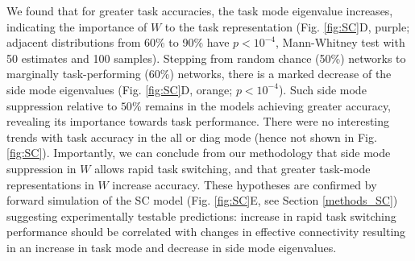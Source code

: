 \documentclass[11pt]{article}
\begin{document}

We found that for greater task accuracies, the task mode eigenvalue increases, indicating the importance of $W$ to the task representation (Fig. \ref{fig:SC}D, purple; adjacent distributions from 60\% to 90\% have  $p<10^{-4}$, Mann-Whitney test with 50 estimates and 100 samples).
Stepping from random chance (50\%) networks to marginally task-performing (60\%) networks, there is a marked decrease of the side mode eigenvalues (Fig. \ref{fig:SC}D, orange; $p<10^{-4}$).  
Such side mode suppression relative to $50\%$ remains in the models achieving greater accuracy, revealing its importance towards task performance.
There were no interesting trends with task accuracy in the all or diag mode (hence not shown in Fig. \ref{fig:SC}). 
Importantly, we can conclude from our methodology that side mode suppression in $W$ allows rapid task switching, and that greater task-mode representations in $W$ increase accuracy.  These hypotheses are confirmed by forward simulation of the SC model (Fig. \ref{fig:SC}E, see Section \ref{methods_SC}) suggesting experimentally testable predictions: increase in rapid task switching performance should be correlated with changes in effective connectivity resulting in an increase in task mode and decrease in side mode eigenvalues.

\end{document}
